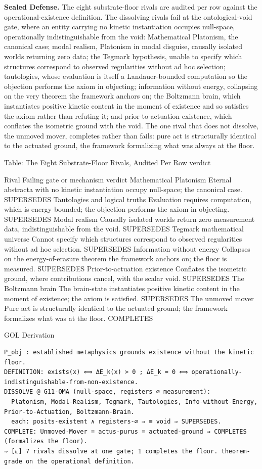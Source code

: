 \documentclass[10pt,twocolumn]{article}
\begin{document}
\textbf{Sealed Defense.} The eight substrate-floor rivals are audited
per row against the operational-existence definition. The dissolving
rivals fail at the ontological-void gate, where an entity carrying no
kinetic instantiation occupies null-space, operationally
indistinguishable from the void: Mathematical Platonism, the canonical
case; modal realism, Platonism in modal disguise, causally isolated
worlds returning zero data; the Tegmark hypothesis, unable to specify
which structures correspond to observed regularities without ad hoc
selection; tautologies, whose evaluation is itself a Landauer-bounded
computation so the objection performs the axiom in objecting;
information without energy, collapsing on the very theorem the framework
anchors on; the Boltzmann brain, which instantiates positive kinetic
content in the moment of existence and so satisfies the axiom rather
than refuting it; and prior-to-actuation existence, which conflates the
isometric ground with the void. The one rival that does not dissolve,
the unmoved mover, completes rather than fails: pure act is structurally
identical to the actuated ground, the framework formalizing what was
always at the floor.

Table: The Eight Substrate-Floor Rivals, Audited Per Row \textbar{}
verdict

Rival Failing gate or mechanism verdict Mathematical Platonism Eternal
abstracta with no kinetic instantiation occupy null-space; the canonical
case. SUPERSEDES Tautologies and logical truths Evaluation requires
computation, which is energy-bounded; the objection performs the axiom
in objecting. SUPERSEDES Modal realism Causally isolated worlds return
zero measurement data, indistinguishable from the void. SUPERSEDES
Tegmark mathematical universe Cannot specify which structures correspond
to observed regularities without ad hoc selection. SUPERSEDES
Information without energy Collapses on the energy-of-erasure theorem
the framework anchors on; the floor is measured. SUPERSEDES
Prior-to-actuation existence Conflates the isometric ground, where
contributions cancel, with the scalar void. SUPERSEDES The Boltzmann
brain The brain-state instantiates positive kinetic content in the
moment of existence; the axiom is satisfied. SUPERSEDES The unmoved
mover Pure act is structurally identical to the actuated ground; the
framework formalizes what was at the floor. COMPLETES

\begin{golbox}{GOL Derivation}
\begin{lstlisting}[style=golv]
P_obj : established metaphysics grounds existence without the kinetic floor.
DEFINITION: exists(x) ⟺ ΔE_k(x) > 0 ; ΔE_k = 0 ⟺ operationally-indistinguishable-from-non-existence.
DISSOLVE @ G11-OMA (null-space, registers ∅ measurement):
  Platonism, Modal-Realism, Tegmark, Tautologies, Info-without-Energy, Prior-to-Actuation, Boltzmann-Brain.
  each: posits-existent ∧ registers-∅ ⇒ ≡ void ⇒ SUPERSEDES.
COMPLETE: Unmoved-Mover ≡ actus-purus ≡ actuated-ground ⇒ COMPLETES (formalizes the floor).
⇒ [⟀] 7 rivals dissolve at one gate; 1 completes the floor. theorem-grade on the operational definition.
\end{lstlisting}
\end{golbox}
\end{document}
